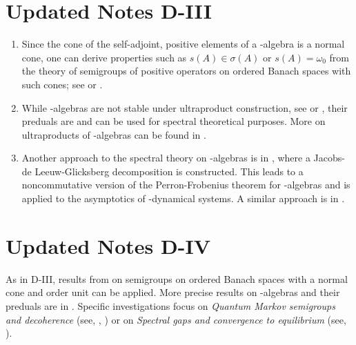 \section*{Updated Notes D-III}
\begin{enumerate}
\item 
Since the cone of the self-adjoint, positive elements of a \CA-algebra is a normal cone, one can derive properties such as $s(A) \in \sigma(A)$ or $s(A) = \omega_{0}$ from the theory of semigroups of positive operators on ordered Banach spaces with such cones; see  or .

\item 
While \WA-algebras are not stable under ultraproduct construction, see  or , their preduals are and can be used for spectral theoretical purposes. 
More on ultraproducts of \WA-algebras can be found in .

\item 
Another approach to the spectral theory on \WA-algebras is in , where a Jacobs-de Leeuw-Glicksberg decomposition is constructed.
This leads to a noncommutative version of the Perron-Frobenius theorem for \WA-algebras and is applied to the asymptotics of \WA-dynamical systems.
A similar approach is in .

\end{enumerate}
\section*{Updated Notes D-IV}
As in D-III, results from  on semigroups on ordered Banach spaces with a normal cone and order unit can be applied. 
More precise results on \WA-algebras and their preduals are in .
Specific investigations focus on \emph{Quantum Markov semigroups and decoherence} (see, \eg, ) or on \emph{Spectral gaps and convergence to equilibrium} (see, \eg {}).